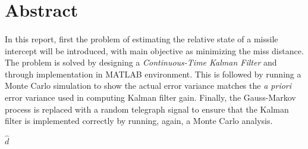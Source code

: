 \section{Abstract}

\paragraph{}
In this report, first the problem of estimating the relative state of a missile intercept will be introduced, with main objective as minimizing the miss distance. The problem is solved by designing a \textit{Continuous-Time Kalman Filter} and through implementation in MATLAB environment. This is followed by running a Monte Carlo simulation to show the actual error variance matches the \textit{a priori} error variance used in computing Kalman filter gain. Finally, the Gauss-Markov process is replaced with a random telegraph signal to ensure that the Kalman filter is implemented correctly by running, again, a Monte Carlo analysis.

$\hat{d}$